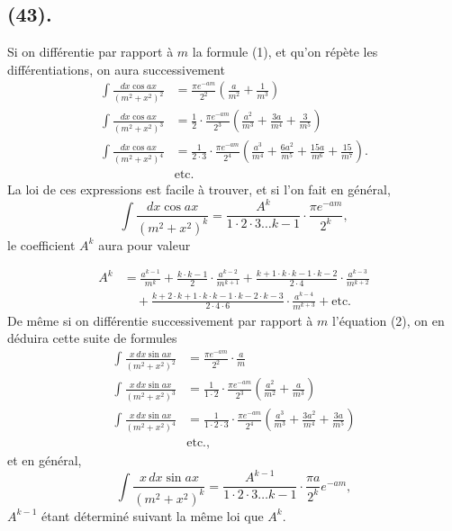 \documentclass{article}
\begin{document}
\subsection*{(43).}

Si on différentie par rapport à $m$ la formule (1), et qu'on répète les différentiations, on aura successivement
\[ \begin{aligned} \int\frac{dx\cos ax}{(m^{2}+x^{2})^{2}}&=\frac{\pi e^{-am}}{2^{2}}\left(\frac{a}{m^{2}}+\frac{1}{m^{3}}\right)\\ \int\frac{dx\cos ax}{(m^{2}+x^{2})^{3}}&=\frac{1}{2}\cdot\frac{\pi e^{-am}}{2^{3}}\left(\frac{a^{2}}{m^{3}}+\frac{3a}{m^{4}}+\frac{3}{m^{5}}\right)\\ \int\frac{dx\cos ax}{(m^{2}+x^{2})^{4}}&=\frac{1}{2\cdot3}\cdot\frac{\pi e^{-am}}{2^{4}}\left(\frac{a^{3}}{m^{4}}+\frac{6a^{2}}{m^{5}}+\frac{15a}{m^{6}}+\frac{15}{m^{7}}\right).\\ &\text{etc.} \end{aligned} \]
La loi de ces expressions est facile à trouver, et si l'on fait en général,
\[ \int\frac{dx\cos ax}{(m^{2}+x^{2})^{k}}=\frac{A^{k}}{1\cdot2\cdot3\ldots k-1}\cdot\frac{\pi e^{-am}}{2^{k}}, \tag{3} \]
le coefficient $A^{k}$ aura pour valeur

\[ \begin{aligned} A^{k}&=\frac{a^{k-1}}{m^{k}}+\frac{k\cdot k-1}{2}\cdot\frac{a^{k-2}}{m^{k+1}}+\frac{k+1\cdot k\cdot k-1\cdot k-2}{2\cdot4}\cdot\frac{a^{k-3}}{m^{k+2}}\\ &\quad+\frac{k+2\cdot k+1\cdot k\cdot k-1\cdot k-2\cdot k-3}{2\cdot4\cdot6}\cdot\frac{a^{k-4}}{m^{k+3}}+\text{etc.} \end{aligned} \]
De même si on différentie successivement par rapport à $m$ l'équation (2), on en déduira cette suite de formules
\[ \begin{aligned} \int\frac{x\,dx\sin ax}{(m^{2}+x^{2})^{2}}&=\frac{\pi e^{-am}}{2^{2}}\cdot\frac{a}{m}\\ \int\frac{x\,dx\sin ax}{(m^{2}+x^{2})^{3}}&=\frac{1}{1\cdot2}\cdot\frac{\pi e^{-am}}{2^{3}}\left(\frac{a^{2}}{m^{2}}+\frac{a}{m^{3}}\right)\\ \int\frac{x\,dx\sin ax}{(m^{2}+x^{2})^{4}}&=\frac{1}{1\cdot2\cdot3}\cdot\frac{\pi e^{-am}}{2^{4}}\left(\frac{a^{3}}{m^{3}}+\frac{3a^{2}}{m^{4}}+\frac{3a}{m^{5}}\right)\\ &\text{etc.}, \end{aligned} \]
et en général,
\[ \int\frac{x\,dx\sin ax}{(m^{2}+x^{2})^{k}}=\frac{A^{k-1}}{1\cdot2\cdot3\ldots k-1}\cdot\frac{\pi a}{2^{k}}e^{-am}, \tag{4} \]
$A^{k-1}$ étant déterminé suivant la même loi que $A^{k}$.
\end{document}
